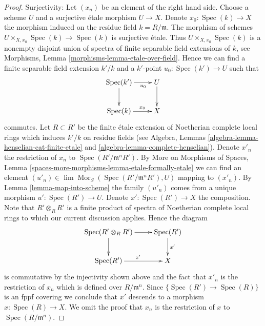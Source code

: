 \documentclass{stacks-project}
\theoremstyle{plain}
\theoremstyle{definition}
\theoremstyle{remark}
\numberwithin{equation}{subsection}
\def\lim{\mathop{\mathrm{lim}}\nolimits}
\def\Spec{\mathop{\mathrm{Spec}}}
\def\Mor{\mathop{\mathrm{Mor}}\nolimits}
\begin{document}
\begin{proof}
\medskip\noindent
Surjectivity: Let $(x_n)$ be an element of the right hand side.
Choose a scheme $U$ and a surjective \'etale morphism $U \to X$. 
Denote $x_0 : \Spec(k) \to X$ the morphism induced on the residue field
$k = R/\mathfrak m$. The morphism of schemes
$U \times_{X, x_0} \Spec(k) \to \Spec(k)$ is surjective \'etale.
Thus $U \times_{X, x_0} \Spec(k)$ is a nonempty disjoint union of spectra
of finite separable field extensions of $k$, see
Morphisms, Lemma \ref{morphisms-lemma-etale-over-field}.
Hence we can find a finite separable field extension $k'/k$
and a $k'$-point $u_0 : \Spec(k') \to U$ such that
$$
\xymatrix{
\Spec(k') \ar[d] \ar[r]_-{u_0} & U \ar[d] \\
\Spec(k) \ar[r]^-{x_0} & X
}
$$
commutes. Let $R \subset R'$ be the finite \'etale extension of Noetherian
complete local rings which induces $k'/k$ on residue fields
(see Algebra, Lemmas \ref{algebra-lemma-henselian-cat-finite-etale} and
\ref{algebra-lemma-complete-henselian}). Denote $x'_n$ the restriction
of $x_n$ to $\Spec(R'/\mathfrak m^nR')$. By
More on Morphisms of Spaces, Lemma
\ref{spaces-more-morphisms-lemma-etale-formally-etale}
we can find an element
$(u'_n) \in \lim \Mor_S(\Spec(R'/\mathfrak m^nR'), U)$
mapping to $(x'_n)$. By Lemma \ref{lemma-map-into-scheme}
the family $(u'_n)$ comes from a unique
morphism $u' : \Spec(R') \to U$. Denote $x' : \Spec(R') \to X$ the
composition. Note that $R' \otimes_R R'$ is a finite product of spectra of
Noetherian complete local rings to which our current discussion applies.
Hence the diagram
$$
\xymatrix{
\Spec(R' \otimes_R R') \ar[r] \ar[d] & \Spec(R') \ar[d]^{x'} \\
\Spec(R') \ar[r]^{x'} & X
}
$$
is commutative by the injectivity shown above and the fact that
$x'_n$ is the restriction of $x_n$ which is defined over $R/\mathfrak m^n$.
Since $\{\Spec(R') \to \Spec(R)\}$ is an fppf covering we conclude
that $x'$ descends to a morphism $x : \Spec(R) \to X$.
We omit the proof that $x_n$ is the restriction of $x$ to
$\Spec(R/\mathfrak m^n)$.
\end{proof}
\end{document}
